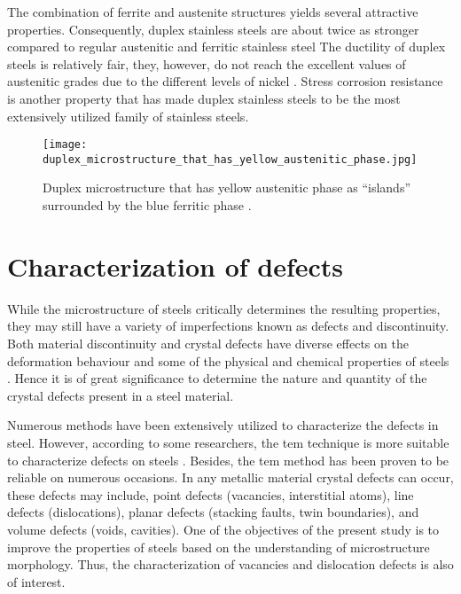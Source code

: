 The combination of ferrite and austenite structures yields several attractive properties. Consequently, duplex stainless steels are about twice as stronger compared to regular austenitic and ferritic stainless steel \cite{steels3practical} The ductility of duplex steels is relatively fair, they, however, do not reach the excellent values of austenitic grades due to the different levels of nickel \cite{molabe2018determining}. Stress corrosion resistance is another property that has made duplex stainless steels to be the most extensively utilized family of stainless steels. 

\begin{figure}[H]
    \centering
    \texttt{[image: duplex\_microstructure\_that\_has\_yellow\_austenitic\_phase.jpg]}
    \caption{Duplex microstructure that has yellow austenitic phase as “islands” surrounded by the blue ferritic phase \cite{steels3practical}.}
    \label{ch3:figure:duplex_microstructure}
\end{figure}

\section{Characterization of defects} 
While the microstructure of steels critically determines the resulting properties, they may still have a variety of imperfections known as defects and discontinuity. Both material discontinuity and crystal defects have diverse effects on the deformation behaviour and some of the physical and chemical properties of steels \cite{suryanarayana2017microstructure}. Hence it is of great significance to determine the nature and quantity of the crystal defects present in a steel material. 

Numerous methods have been extensively utilized to characterize the defects in steel. However, according to some researchers, the \Acrfull{tem} technique is more suitable to characterize defects on steels \cite{george2002introduction, bhadeshia2017steels}. Besides, the \acrshort{tem} method has been proven to be reliable on numerous occasions. In any metallic material crystal defects can occur, these defects may include, point defects (vacancies, interstitial atoms), line defects (dislocations), planar defects (stacking faults, twin boundaries), and volume defects (voids, cavities). One of the objectives of the present study is to improve the properties of steels based on the understanding of microstructure morphology. Thus, the characterization of vacancies and dislocation defects is also of interest.


